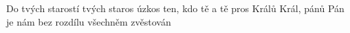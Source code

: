 \begin{TEXT}{Do tvých starostí}
\SLOKA[A.]  tvých staros  úzkos \NL
{} ten, kdo  tě  a  tě pros 
\SLOKA[B.] Králů Král, pánů Pán \NL
je nám bez rozdílu všechněm zvěstován \NL
\end{TEXT}
